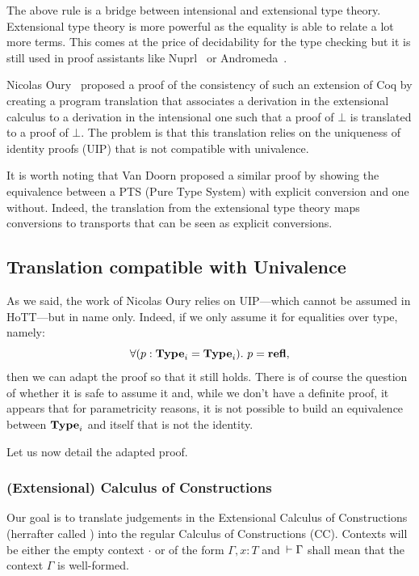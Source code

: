 \documentclass[11pt]{article}
\theoremstyle{plain}
\theoremstyle{remark}
\begin{document}
\begin{mathc}
\end{mathc}
%
The above rule is a bridge between intensional and extensional type theory.
Extensional type theory is more powerful as the equality is able to relate a lot
more terms. This comes at the price of decidability for the type checking but it
is still used in proof assistants like Nuprl~\cite{constableimplementing} or
Andromeda~\cite{andromeda}.

Nicolas Oury~\cite{oury2005extensionality} proposed a proof of the consistency
of such an extension of Coq by creating a program translation that associates a
derivation in the extensional calculus to a derivation in the intensional one
such that a proof of $\bot$ is translated to a proof of $\bot$.
The problem is that this translation relies on the uniqueness of identity
proofs (UIP) that is not compatible with univalence.

It is worth noting that Van Doorn \etal \cite{van2013explicit} proposed a
similar proof by showing the equivalence between a PTS (Pure Type System) with
explicit conversion and one without. Indeed, the translation from the
extensional type theory maps conversions to transports that can be seen as
explicit conversions.

\subsection{Translation compatible with Univalence}

As we said, the work of Nicolas Oury relies on UIP---which cannot be assumed in
HoTT---but in name only. Indeed, if we only assume it for equalities over
type, namely:
\[ \forall (p : \operatorname{\mathbf{Type}}_i = \operatorname{\mathbf{Type}}_i).\ p = \operatorname{\mathbf{refl}}, \]
then we can adapt the proof so that it still holds.
There is of course the question of whether it is safe to assume it and, while
we don't have a definite proof, it appears that for parametricity reasons,
it is not possible to build an equivalence between $\operatorname{\mathbf{Type}}_i$ and itself that
is not the identity.

Let us now detail the adapted proof.

\subsubsection{(Extensional) Calculus of Constructions}

Our goal is to translate judgements in the Extensional Calculus of
Constructions (herrafter called \CCe) into the regular Calculus of Constructions
(CC). Contexts will be either the empty context $\cdot$ or of the form
$\Gamma, x:T$ and $\,\vdash \Gamma$ shall mean that the context $\Gamma$ is
well-formed.
\end{document}

